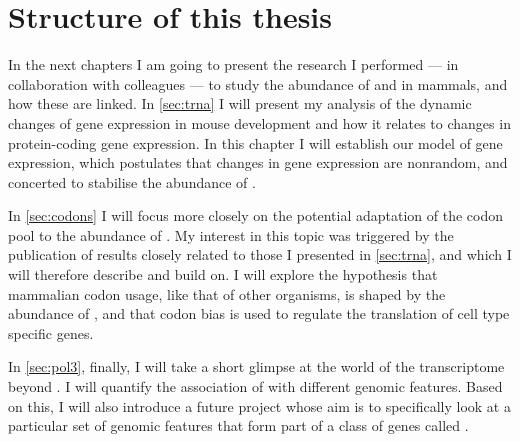 \section{Structure of this thesis}

In the next chapters I am going to present the research I performed --- in
collaboration with colleagues ---  to study the abundance of \trna and \mrna in
mammals, and how these are linked. In \cref{sec:trna} I will present my analysis
of the dynamic changes of \trna gene expression in mouse development and how it
relates to changes in protein-coding gene expression. In this chapter I will
establish our model of \trna gene expression, which postulates that changes in
\trna gene expression are nonrandom, and concerted to stabilise the abundance of
\trna[s].

In \cref{sec:codons} I will focus more closely on the potential adaptation of
the codon pool to the abundance of \trna[s]. My interest in this topic was
triggered by the publication of results closely related to those I presented in
\cref{sec:trna}, and which I will therefore describe and build on. I will
explore the hypothesis that mammalian codon usage, like that of other organisms,
is shaped by the abundance of \trna[s], and that codon bias is used to regulate
the translation of cell type specific genes.

In \cref{sec:pol3}, finally, I will take a short glimpse at the world of the
 transcriptome beyond \trna[s]. I will quantify the association of 
with different genomic features. Based on this, I will also introduce a future
project whose aim is to specifically look at a particular set of genomic
features that form part of a class of genes called .

